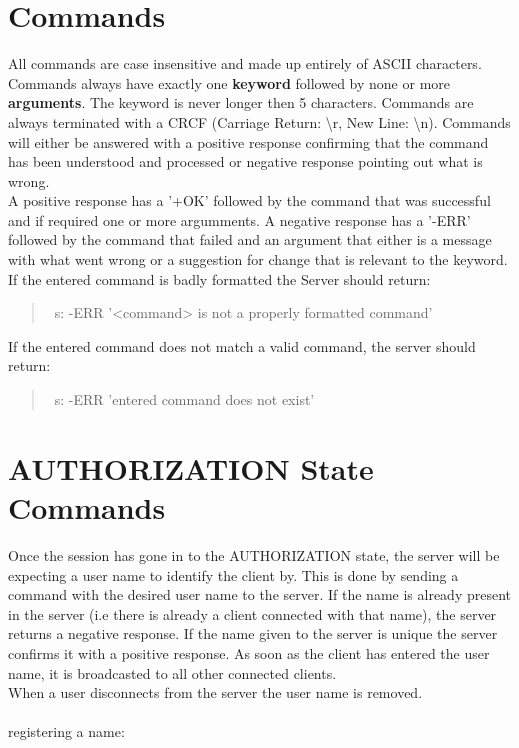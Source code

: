 \documentclass[a4paper,11pt]{article}
\begin{document}
\section{Commands}
All commands are case insensitive and made up entirely of ASCII characters. Commands always have exactly one \textbf{keyword} followed by none or more \textbf{arguments}. The keyword is never longer then 5 characters. Commands are always terminated with a CRCF (Carriage Return: \textbackslash r, New Line: \textbackslash n). Commands will either be answered with a positive response confirming that the command has been understood and processed or negative response pointing out what is wrong.\\
A positive response has a '+OK' followed by the command that was successful and if required one or more argumments. A negative response has a '-ERR' followed by the command that failed and an argument that either is a message with what went wrong or a suggestion for change that is relevant to the keyword.\\
\clearpage
If the entered command is badly formatted the Server should return:
\begin{quote}\
  s: -ERR '<command> is not a properly formatted command'
\end{quote}
If the entered command does not match a valid command, the server should return:
\begin{quote}\
  s: -ERR 'entered command does not exist'
\end{quote}
\clearpage

\section{AUTHORIZATION State Commands}
Once the session has gone in to the AUTHORIZATION state, the server will be expecting a user name to identify the client by. This is done by sending a command with the desired user name to the server. If the name is already present in the server (i.e there is already a client connected with that name), the server returns a negative response. If the name given to the server is unique the server confirms it with a positive response. As soon as the client has entered the user name, it is broadcasted to all other connected clients.\\ 
When a user disconnects from the server the user name is removed.\\\\
registering a name:
\end{document}
